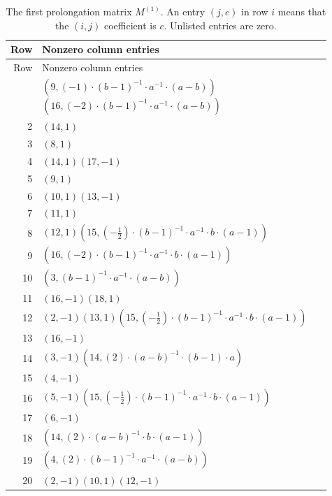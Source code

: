 \begingroup\small
\setlength{\tabcolsep}{3pt}
\renewcommand{\arraystretch}{1.16}
\begin{longtable}{@{}r>{\raggedright\arraybackslash}p{0.91\linewidth}@{}}
\caption{The first prolongation matrix $M^{(1)}$. An entry $(j,c)$ in row $i$ means that the $(i,j)$ coefficient is $c$. Unlisted entries are zero.}\label{supp:matrix-M1}\\
\toprule Row & Nonzero column entries\\\midrule\endfirsthead
\toprule Row & Nonzero column entries\\\midrule\endhead
\bottomrule\endfoot
1 & \((9,\left(-1\right) \cdot (b - 1)^{-1} \cdot a^{-1} \cdot (a - b))\)\allowbreak\quad \((16,\left(-2\right) \cdot (b - 1)^{-1} \cdot a^{-1} \cdot (a - b))\)\\
2 & \((14,1)\)\\
3 & \((8,1)\)\\
4 & \((14,1)\)\allowbreak\quad \((17,-1)\)\\
5 & \((9,1)\)\\
6 & \((10,1)\)\allowbreak\quad \((13,-1)\)\\
7 & \((11,1)\)\\
8 & \((12,1)\)\allowbreak\quad \((15,\left(-\frac{1}{2}\right) \cdot (b - 1)^{-1} \cdot a^{-1} \cdot b \cdot (a - 1))\)\\
9 & \((16,\left(-2\right) \cdot (b - 1)^{-1} \cdot a^{-1} \cdot b \cdot (a - 1))\)\\
10 & \((3,(b - 1)^{-1} \cdot a^{-1} \cdot (a - b))\)\\
11 & \((16,-1)\)\allowbreak\quad \((18,1)\)\\
12 & \((2,-1)\)\allowbreak\quad \((13,1)\)\allowbreak\quad \((15,\left(-\frac{1}{2}\right) \cdot (b - 1)^{-1} \cdot a^{-1} \cdot b \cdot (a - 1))\)\\
13 & \((16,-1)\)\\
14 & \((3,-1)\)\allowbreak\quad \((14,\left(2\right) \cdot (a - b)^{-1} \cdot (b - 1) \cdot a)\)\\
15 & \((4,-1)\)\\
16 & \((5,-1)\)\allowbreak\quad \((15,\left(-\frac{1}{2}\right) \cdot (b - 1)^{-1} \cdot a^{-1} \cdot b \cdot (a - 1))\)\\
17 & \((6,-1)\)\\
18 & \((14,\left(2\right) \cdot (a - b)^{-1} \cdot b \cdot (a - 1))\)\\
19 & \((4,\left(2\right) \cdot (b - 1)^{-1} \cdot a^{-1} \cdot (a - b))\)\\
20 & \((2,-1)\)\allowbreak\quad \((10,1)\)\allowbreak\quad \((12,-1)\)\\

\end{longtable}
